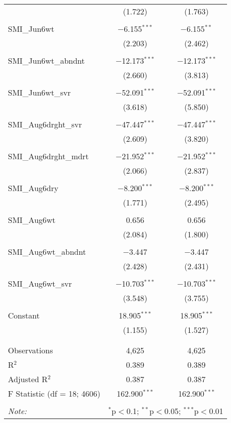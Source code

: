 \documentclass[12pt]{iopart}
\begin{document}
\begin{table}[!htbp]
{\begin{tabular}{@{\extracolsep{5pt}}lcc}
		& (1.722) & (1.763) \\ 
		& & \\ 
		SMI\_Jun6wt & $-$6.155$^{***}$ & $-$6.155$^{**}$ \\ 
		& (2.203) & (2.462) \\ 
		& & \\ 
		SMI\_Jun6wt\_abndnt & $-$12.173$^{***}$ & $-$12.173$^{***}$ \\ 
		& (2.660) & (3.813) \\ 
		& & \\ 
		SMI\_Jun6wt\_svr & $-$52.091$^{***}$ & $-$52.091$^{***}$ \\ 
		& (3.618) & (5.850) \\ 
		& & \\ 
		SMI\_Aug6drght\_svr & $-$47.447$^{***}$ & $-$47.447$^{***}$ \\ 
		& (2.609) & (3.820) \\ 
		& & \\ 
		SMI\_Aug6drght\_mdrt & $-$21.952$^{***}$ & $-$21.952$^{***}$ \\ 
		& (2.066) & (2.837) \\ 
		& & \\ 
		SMI\_Aug6dry & $-$8.200$^{***}$ & $-$8.200$^{***}$ \\ 
		& (1.771) & (2.495) \\ 
		& & \\ 
		SMI\_Aug6wt & 0.656 & 0.656 \\ 
		& (2.084) & (1.800) \\ 
		& & \\ 
		SMI\_Aug6wt\_abndnt & $-$3.447 & $-$3.447 \\ 
		& (2.428) & (2.431) \\ 
		& & \\ 
		SMI\_Aug6wt\_svr & $-$10.703$^{***}$ & $-$10.703$^{***}$ \\ 
		& (3.548) & (3.755) \\ 
		& & \\ 
		Constant & 18.905$^{***}$ & 18.905$^{***}$ \\ 
		& (1.155) & (1.527) \\ 
		& & \\ 
		\hline \\[-1.8ex] 
		Observations & 4,625 & 4,625 \\ 
		R$^{2}$ & 0.389 & 0.389 \\ 
		Adjusted R$^{2}$ & 0.387 & 0.387 \\ 
		F Statistic (df = 18; 4606) & 162.900$^{***}$ & 162.900$^{***}$ \\ 
		\hline 
		\hline \\[-1.8ex] 
		\textit{Note:}  & \multicolumn{2}{r}{$^{*}$p$<$0.1; $^{**}$p$<$0.05; $^{***}$p$<$0.01} \\ 
	\end{tabular} 
	 }
\end{table} 
\end{document}
